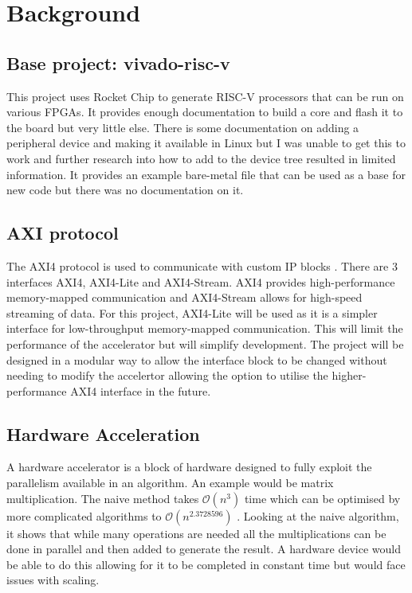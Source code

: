 \section{Background}
\label{sec:background}

\subsection{Base project: vivado-risc-v}
This project uses Rocket Chip to generate RISC-V processors that can be run on various FPGAs. It provides enough documentation to build a core and flash it to the board but very little else. There is some documentation on adding a peripheral device and making it available in Linux but I was unable to get this to work and further research into how to add to the device tree resulted in limited information. It provides an example bare-metal file that can be used as a base for new code but there was no documentation on it.

\subsection{AXI protocol}
The AXI4 protocol is used to communicate with custom IP blocks \cite{axi}. There are 3 interfaces AXI4, AXI4-Lite and AXI4-Stream. AXI4 provides high-performance memory-mapped communication and AXI4-Stream allows for high-speed streaming of data. For this project, AXI4-Lite will be used as it is a simpler interface for low-throughput memory-mapped communication. This will limit the performance of the accelerator but will simplify development. The project will be designed in a modular way to allow the interface block to be changed without needing to modify the accelertor allowing the option to utilise the higher-performance AXI4 interface in the future.

\subsection{Hardware Acceleration}
A hardware accelerator is a block of hardware designed to fully exploit the parallelism available in an algorithm. An example would be matrix multiplication. The naive method takes $\mathcal{O}(n^{3})$ time which can be optimised by more complicated algorithms to $\mathcal{O}(n^{2.3728596})$ \citep{alman2020refined}. Looking at the naive algorithm, it shows that while many operations are needed all the multiplications can be done in parallel and then added to generate the result. A hardware device would be able to do this allowing for it to be completed in constant time but would face issues with scaling.

